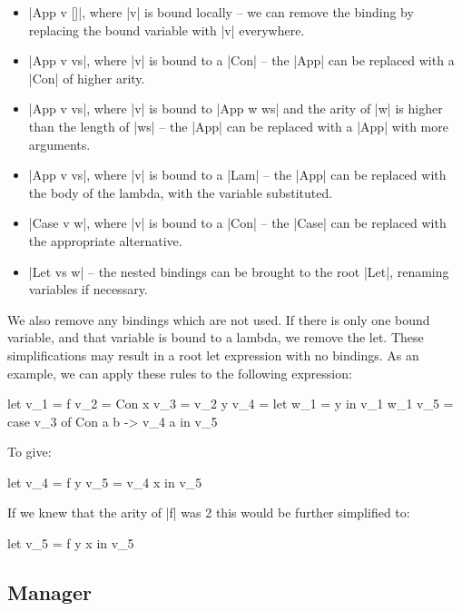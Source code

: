 \documentclass[draft]{sigplanconf}
\begin{document}
\begin{itemize}
\item |App v []|, where |v| is bound locally -- we can remove the binding by replacing the bound variable with |v| everywhere.
\item |App v vs|, where |v| is bound to a |Con| -- the |App| can be replaced with a |Con| of higher arity.
\item |App v vs|, where |v| is bound to |App w ws| and the arity of |w| is higher than the length of |ws| -- the |App| can be replaced with a |App| with more arguments.
\item |App v vs|, where |v| is bound to a |Lam| -- the |App| can be replaced with the body of the lambda, with the variable substituted.
\item |Case v w|, where |v| is bound to a |Con| -- the |Case| can be replaced with the appropriate alternative.
\item |Let vs w| -- the nested bindings can be brought to the root |Let|, renaming variables if necessary.
\end{itemize}

We also remove any bindings which are not used. If there is only one bound variable, and that variable is bound to a lambda, we remove the let. These simplifications may result in a root let expression with no bindings. As an example, we can apply these rules to the following expression:

\begin{code}
let  v_1  = f
     v_2  = Con x
     v_3  = v_2 y
     v_4  = let w_1 = y in v_1 w_1
     v_5  = case v_3 of Con a b -> v_4 a
in   v_5
\end{code}

\noindent To give:

\begin{code}
let  v_4  = f y
     v_5  = v_4 x
in   v_5
\end{code}

\noindent If we knew that the arity of |f| was 2 this would be further simplified to:

\begin{code}
let  v_5  = f y x
in   v_5
\end{code}

\subsection{Manager}
\label{sec:manager}
\end{document}
